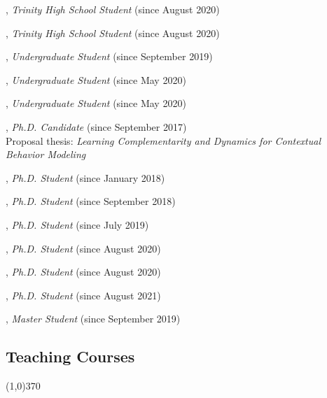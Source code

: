 \documentclass[10pt]{article}
\newenvironment{myindentpar}[1]%
{\begin{list}{}%
         {\setlength{\leftmargin}{#1}}%
         \item[]%
}
{\end{list}}
\newcounter{list}
\begin{document}
\begin{myindentpar}{0.75cm}

\hspace{-0.75cm}{\bf Rebekah Fang}, \textit{Trinity High School Student} (since August 2020)

\hspace{-0.75cm}{\bf Libby Garnett}, \textit{Trinity High School Student} (since August 2020)

\hspace{-0.75cm}{\bf Bo Ni}, \textit{Undergraduate Student} (since September 2019)

\hspace{-0.75cm}{\bf Ann Hermann}, \textit{Undergraduate Student} (since May 2020)

\hspace{-0.75cm}{\bf Michael Lee}, \textit{Undergraduate Student} (since May 2020)

\hspace{-0.75cm}{\bf Daheng Wang}, \textit{Ph.D. Candidate} (since September 2017) \\
	Proposal thesis: \textit{Learning Complementarity and Dynamics for Contextual Behavior Modeling}

\hspace{-0.75cm}{\bf Qingkai Zeng}, \textit{Ph.D. Student} (since January 2018)

\hspace{-0.75cm}{\bf Tong Zhao}, \textit{Ph.D. Student} (since September 2018)

\hspace{-0.75cm}{\bf Wenhao Yu}, \textit{Ph.D. Student} (since July 2019)

\hspace{-0.75cm}{\bf Lingbo Tong}, \textit{Ph.D. Student} (since August 2020)

\hspace{-0.75cm}{\bf Mengxia Yu}, \textit{Ph.D. Student} (since August 2020)

\hspace{-0.75cm}{\bf Zhihan Zhang}, \textit{Ph.D. Student} (since August 2021)

\hspace{-0.75cm}{\bf Jianing Li}, \textit{Master Student} (since September 2019)

\end{myindentpar}

\subsection{\sc Teaching Courses}
\vspace{-0.4cm} \line(1,0){370} \vspace{-0.1cm}
\end{document}

